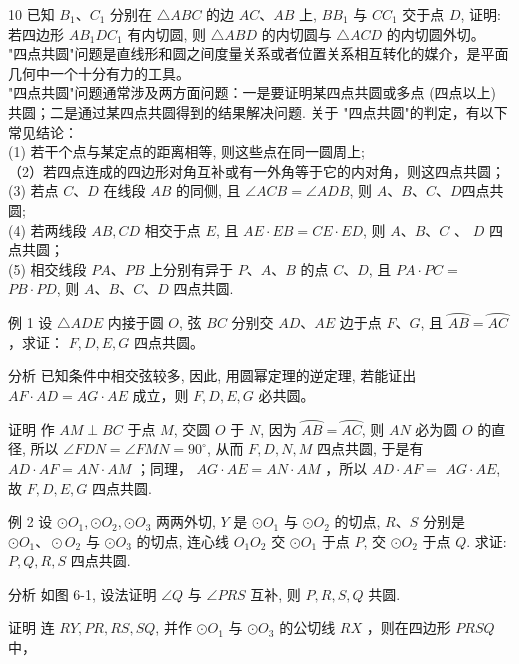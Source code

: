 \documentclass[10pt]{article}
\begin{document}
10 已知 $B_{1} 、 C_{1}$ 分别在 $\triangle A B C$ 的边 $A C 、 A B$ 上, $B B_{1}$ 与 $C C_{1}$ 交于点 $D$, 证明: 若四边形 $A B_{1} D C_{1}$ 有内切圆, 则 $\triangle A B D$ 的内切圆与 $\triangle A C D$ 的内切圆外切。\\
"四点共圆"问题是直线形和圆之间度量关系或者位置关系相互转化的媒介，是平面几何中一个十分有力的工具。\\
"四点共圆"问题通常涉及两方面问题：一是要证明某四点共圆或多点 (四点以上) 共圆；二是通过某四点共圆得到的结果解决问题. 关于 "四点共圆"的判定，有以下常见结论：\\
(1) 若干个点与某定点的距离相等, 则这些点在同一圆周上;\\
（2）若四点连成的四边形对角互补或有一外角等于它的内对角，则这四点共圆；\\
(3) 若点 $C 、 D$ 在线段 $A B$ 的同侧, 且 $\angle A C B=\angle A D B$, 则 $A 、 B 、 C 、 D$四点共圆;\\
(4) 若两线段 $A B, C D$ 相交于点 $E$, 且 $A E \cdot E B=C E \cdot E D$, 则 $A 、 B 、 C$ 、 $D$ 四点共圆；\\
(5) 相交线段 $P A 、 P B$ 上分别有异于 $P 、 A 、 B$ 的点 $C 、 D$, 且 $P A \cdot P C=$ $P B \cdot P D$, 则 $A 、 B 、 C 、 D$ 四点共圆.

例 1 设 $\triangle A D E$ 内接于圆 $O$, 弦 $B C$ 分别交 $A D 、 A E$ 边于点 $F 、 G$, 且 $\overparen{A B}=\overparen{A C}$ ，求证： $F, D, E, G$ 四点共圆。

分析 已知条件中相交弦较多, 因此, 用圆幂定理的逆定理, 若能证出 $A F \cdot A D=A G \cdot A E$ 成立，则 $F, D, E, G$ 必共圆。

证明 作 $A M \perp B C$ 于点 $M$, 交圆 $O$ 于 $N$, 因为 $\overparen{A B}=\overparen{A C}$, 则 $A N$ 必为圆 $O$ 的直径, 所以 $\angle F D N=\angle F M N=90^{\circ}$, 从而 $F, D, N, M$ 四点共圆, 于是有 $A D \cdot A F=A N \cdot A M$ ；同理， $A G \cdot A E=A N \cdot A M$ ，所以 $A D \cdot A F=$ $A G \cdot A E$, 故 $F, D, E, G$ 四点共圆.

例 2 设 $\odot O_{1}, \odot O_{2}, \odot O_{3}$ 两两外切, $Y$ 是 $\odot O_{1}$ 与 $\odot O_{2}$ 的切点, $R 、 S$ 分别是 $\odot O_{1} 、 \odot O_{2}$ 与 $\odot O_{3}$ 的切点, 连心线 $O_{1} O_{2}$ 交 $\odot O_{1}$ 于点 $P$, 交 $\odot O_{2}$ 于点 $Q$. 求证: $P, Q, R, S$ 四点共圆.

分析 如图 6-1, 设法证明 $\angle Q$ 与 $\angle P R S$ 互补, 则 $P, R, S, Q$ 共圆.

证明 连 $R Y, P R, R S, S Q$, 并作 $\odot O_{1}$ 与 $\odot O_{3}$ 的公切线 $R X$ ，则在四边形 $P R S Q$ 中，
\end{document}
